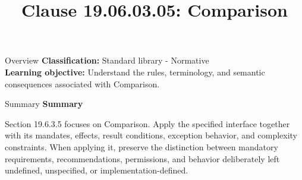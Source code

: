 \documentclass[10pt,letterpaper]{article}
\title{Clause 19.06.03.05: Comparison}
\author{}
\date{}
\begin{document}
\maketitle
\begin{CornellOverviewBox}{Overview}
\textbf{Classification:} Standard library - Normative\\[2pt]
\textbf{Learning objective:} Understand the rules, terminology, and semantic consequences associated with Comparison.
\end{CornellOverviewBox}\begin{CornellSummaryBox}{Summary}
{\sffamily\bfseries\color{Accent} Summary}\par\vspace{3pt}Section 19.6.3.5 focuses on Comparison. Apply the specified interface together with its mandates, effects, result conditions, exception behavior, and complexity constraints. When applying it, preserve the distinction between mandatory requirements, recommendations, permissions, and behavior deliberately left undefined, unspecified, or implementation-defined.
\end{CornellSummaryBox}
\end{document}
